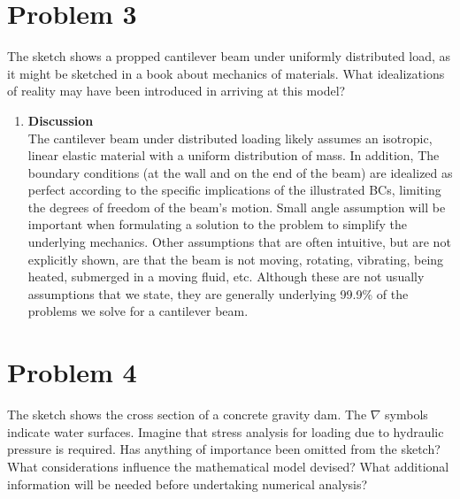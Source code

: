 \documentclass[12pt,letterpaper]{article}
\begin{document}
	\newpage
	
	\section*{Problem 3}
	The sketch shows a propped cantilever beam under uniformly distributed load, as it might be sketched in a book about mechanics of materials. What idealizations of reality may have been introduced in arriving at this model?

		\begin{enumerate}[label=\arabic*.]

			\item{\textbf{Discussion}}\\
			The cantilever beam under distributed loading likely assumes an isotropic, linear elastic material with a uniform distribution of mass. In addition, The boundary conditions (at the wall and on the end of the beam) are idealized as perfect according to the specific implications of the illustrated BCs, limiting the degrees of freedom of the beam's motion. Small angle assumption will be important when formulating a solution to the problem to simplify the underlying mechanics. Other assumptions that are often intuitive, but are not explicitly shown, are that the beam is not moving, rotating, vibrating, being heated, submerged in a moving fluid, etc. Although these are not usually assumptions that we state, they are generally underlying 99.9\% of the problems we solve for a cantilever beam. 

		\end{enumerate}
	
	\newpage
	
	\section*{Problem 4}
	The sketch shows the cross section of a concrete gravity dam. The $\nabla$ symbols indicate water surfaces. Imagine that stress analysis for loading due to hydraulic pressure is required. Has anything of importance been omitted from the sketch? What considerations influence the mathematical model devised? What additional information will be needed before undertaking numerical analysis?
	
\end{document}
